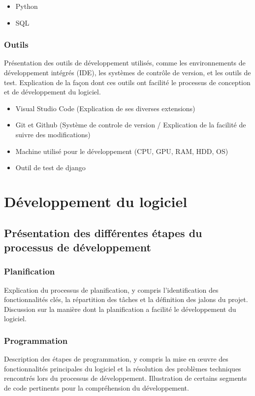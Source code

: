 \begin{itemize}
    \item Python \citep*{python}
    \item SQL
\end{itemize}

\subsubsection{Outils}
Présentation des outils de développement utilisés, comme les environnements de développement intégrés (IDE), les systèmes de contrôle de version, et les outils de test. Explication de la façon dont ces outils ont facilité le processus de conception et de développement du logiciel.

\begin{itemize}
    \item Visual Studio Code (Explication de ses diverses extensions) \citep*{vscode}
    \item Git et Github (Système de controle de version / Explication de la facilité de suivre des modifications) \citep*{git, github}
    \item Machine utilisé pour le développement (CPU, GPU, RAM, HDD, OS)
    \item Outil de test de django
\end{itemize}

\section{Développement du logiciel}
\subsection{Présentation des différentes étapes du processus de développement}
\subsubsection{Planification}
Explication du processus de planification, y compris l'identification des fonctionnalités clés, la répartition des tâches et la définition des jalons du projet. Discussion sur la manière dont la planification a facilité le développement du logiciel.

\subsubsection{Programmation}
Description des étapes de programmation, y compris la mise en œuvre des fonctionnalités principales du logiciel et la résolution des problèmes techniques rencontrés lors du processus de développement. Illustration de certains segments de code pertinents pour la compréhension du développement.

